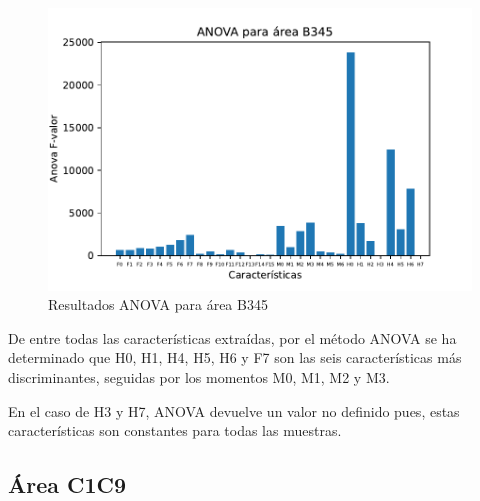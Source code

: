 \begin{figure}[H]
	\centering
	\captionsetup{justification=centering}
	\includegraphics[width=\textwidth]{imagenes/resultados/anova/ANOVA_b345.pdf}
	\caption{Resultados ANOVA para área B345}
\end{figure}

De entre todas las características extraídas, por el método ANOVA se ha determinado que H0, H1, H4, H5, H6 y F7 son las seis características más discriminantes, seguidas por los momentos M0, M1, M2 y M3.

En el caso de H3 y H7, ANOVA devuelve un valor no definido pues, estas características son constantes para todas las muestras.

\subsection{Área C1C9}

